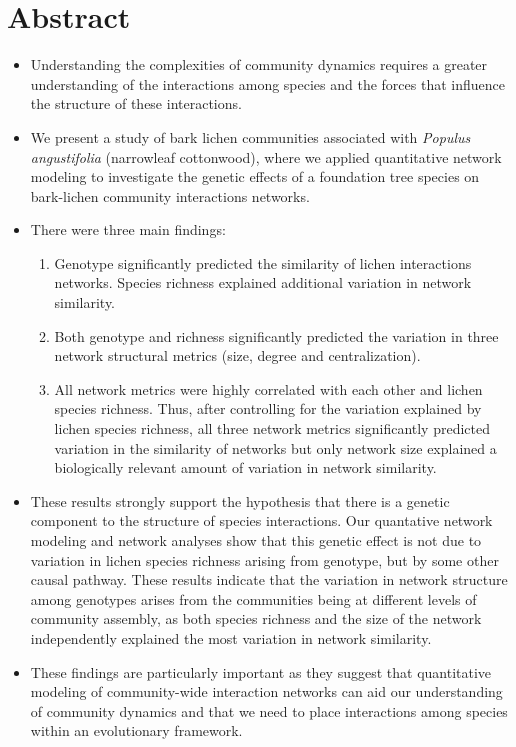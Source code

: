 \documentclass[11pt]{amsart}
\begin{document}
\section{Abstract}
\begin{itemize}
\item Understanding the complexities of community dynamics requires a
  greater understanding of the interactions among species and the
  forces that influence the structure of these interactions. 
\item We present a study of bark lichen communities associated with
  \textit{Populus angustifolia} (narrowleaf cottonwood), where we
  applied quantitative network modeling to investigate the genetic
  effects of a foundation tree species on bark-lichen community
  interactions networks.
\item There were three main findings:
  \begin{enumerate}
  \item Genotype significantly predicted the similarity of lichen
    interactions networks. Species richness explained additional
    variation in network similarity.
  \item Both genotype and richness significantly predicted the
    variation in three network structural metrics (size, degree and
    centralization). 
  \item All network metrics were highly correlated with each other and
    lichen species richness. Thus, after controlling for the variation explained by lichen
    species richness, all three network metrics significantly
    predicted variation in the similarity of networks but only
    network size explained a biologically relevant amount of variation
    in network similarity. 
  \end{enumerate}
\item These results strongly support the hypothesis that there is a
  genetic component to the structure of species interactions. Our
  quantative network modeling and network analyses show that this
  genetic effect is not due to variation in lichen species richness
  arising from genotype, but by some other causal pathway. These
  results indicate that the variation in network structure among
  genotypes arises from the communities being at different levels of
  community assembly, as both species richness and the size of the
  network independently explained the most variation in network similarity.
\item These findings are particularly important as they suggest that
  quantitative modeling of community-wide interaction networks can aid
  our understanding of community dynamics and that we need to place
  interactions among species within an evolutionary framework.
\end{itemize}
\end{document}

